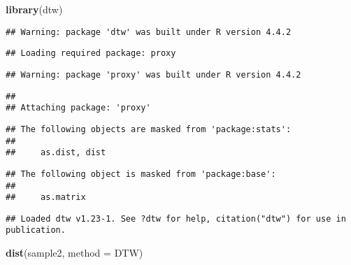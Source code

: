 \documentclass[
]{article}
\newenvironment{Shaded}{\begin{snugshade}}{\end{snugshade}}
\newcommand{\AttributeTok}[1]{\textcolor[rgb]{0.13,0.29,0.53}{#1}}
\newcommand{\FunctionTok}[1]{\textcolor[rgb]{0.13,0.29,0.53}{\textbf{#1}}}
\newcommand{\NormalTok}[1]{#1}
\newcommand{\StringTok}[1]{\textcolor[rgb]{0.31,0.60,0.02}{#1}}
\begin{document}
\begin{Shaded}
\begin{Highlighting}[]
\FunctionTok{library}\NormalTok{(dtw)}
\end{Highlighting}
\end{Shaded}

\begin{verbatim}
## Warning: package 'dtw' was built under R version 4.4.2
\end{verbatim}

\begin{verbatim}
## Loading required package: proxy
\end{verbatim}

\begin{verbatim}
## Warning: package 'proxy' was built under R version 4.4.2
\end{verbatim}

\begin{verbatim}
## 
## Attaching package: 'proxy'
\end{verbatim}

\begin{verbatim}
## The following objects are masked from 'package:stats':
## 
##     as.dist, dist
\end{verbatim}

\begin{verbatim}
## The following object is masked from 'package:base':
## 
##     as.matrix
\end{verbatim}

\begin{verbatim}
## Loaded dtw v1.23-1. See ?dtw for help, citation("dtw") for use in publication.
\end{verbatim}

\begin{Shaded}
\begin{Highlighting}[]
\FunctionTok{dist}\NormalTok{(sample2, }\AttributeTok{method =} \StringTok{\textquotesingle{}DTW\textquotesingle{}}\NormalTok{)}
\end{Highlighting}
\end{Shaded}
\end{document}
